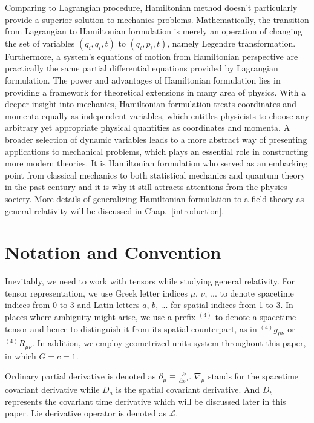 Comparing to Lagrangian procedure, Hamiltonian method doesn't particularly provide a superior solution to mechanics problems. Mathematically, the transition from Lagrangian to Hamiltonian formulation is merely an operation of changing the set of variables $(q_{i}, {\dot q}_{i}, t)$ to $(q_{i}, p_{i}, t)$, namely Legendre transformation. Furthermore, a system's equations of motion from Hamiltonian perspective are practically the same partial differential equations provided by Lagrangian formulation. The power and advantages of Hamiltonian formulation lies in providing a framework for theoretical extensions in many area of physics. With a deeper insight into mechanics, Hamiltonian formulation treats coordinates and momenta equally as independent variables, which entitles physicists to choose any arbitrary yet appropriate physical quantities as coordinates and momenta. A broader selection of dynamic variables leads to a more abstract way of presenting applications to mechanical problems, which plays an essential role in constructing more modern theories. It is Hamiltonian formulation who served as an embarking point from classical mechanics to both statistical mechanics and quantum theory in the past century and it is why it still attracts attentions from the physics society\cite{goldstein}. More details of generalizing Hamiltonian formulation to a field theory as general relativity will be discussed in Chap.~\ref{introduction}. 

\section{Notation and Convention}\label{notation} Inevitably, we need to work with tensors while studying general relativity. For tensor representation, we use Greek letter indices $\mu$, $\nu$, ... to denote spacetime indices from 0 to 3 and Latin letters $a$, $b$, ... for spatial indices from 1 to 3. In places where ambiguity might arise, we use a prefix $^{(4)}$ to denote a spacetime tensor and hence to distinguish it from its spatial counterpart, as in $^{(4)}g_{\mu\nu}$ or $^{(4)}R_{\mu\nu}$. In addition, we employ geometrized  units system throughout this paper, in which $G = c = 1$.

Ordinary partial derivative is denoted as $
\partial_{\mu} \equiv \frac{
\partial}{
\partial x^{\mu}}$. $\nabla_{\mu}$ stands for the spacetime covariant derivative while $D_{a}$ is the spatial covariant derivative. And $D_{t}$ represents the covariant time derivative which will be discussed later in this paper. Lie derivative operator is denoted as $\mathcal{L}$. 

